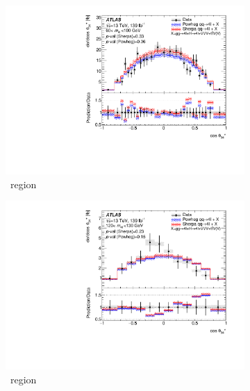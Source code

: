 \begin{figure}[htb!]
    \begin{subfigure}{.49\textwidth}\centering
      \includegraphics[width=.99\linewidth]{Figures/m4l/UnfoldedResults/linY_Unfolded_Data_cosThetaStar3_m4l60-100.pdf}\caption{\ZFourL \ region}\label{fig:sub-first}
    \end{subfigure}
    \begin{subfigure}{.49\textwidth}\centering
      \includegraphics[width=.99\linewidth]{Figures/m4l/UnfoldedResults/linY_Unfolded_Data_cosThetaStar3_m4l120-130.pdf} \caption{\HFourL \ region}\label{fig:sub-second}
    \end{subfigure}
    \begin{subfigure}{.49\textwidth}\centering

\end{subfigure}
\end{figure}
